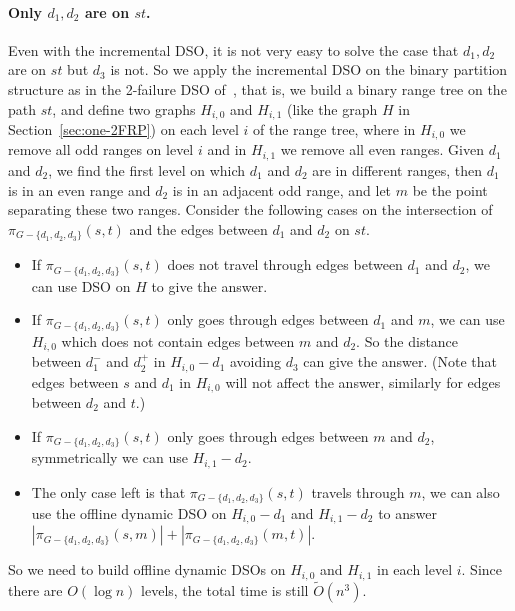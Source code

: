 \documentclass[11pt]{article}
\theoremstyle{plain}
\theoremstyle{definition}
\newcommand{\set}[1]{\{ #1 \}}
\newcommand{\og}[3]{\pi_{G-#3}\left(#1,#2\right)}
\begin{document}
\paragraph{Only $d_1,d_2$ are on $st$.} Even with the incremental DSO, it is not very easy to solve the case that $d_1,d_2$ are on $st$ but $d_3$ is not. So we apply the incremental DSO on the binary partition structure as in the 2-failure DSO of~\cite{duan2009dual}, that is, we build a binary range tree on the path $st$, and define two graphs $H_{i,0}$ and $H_{i,1}$ (like the graph $H$ in Section~\ref{sec:one-2FRP}) on each level $i$ of the range tree, where in $H_{i,0}$ we remove all odd ranges on level $i$ and in $H_{i,1}$ we remove all even ranges. Given $d_1$ and $d_2$, we find the first level on which $d_1$ and $d_2$ are in different ranges, then $d_1$ is in an even range and $d_2$ is in an adjacent odd range, and let $m$ be the point separating these two ranges. Consider the following cases on the intersection of $\og{s}{t}{\set{d_1, d_2,d_3}}$ and the edges between $d_1$ and $d_2$ on $st$.
\begin{itemize}
    \item If $\og{s}{t}{\set{d_1, d_2,d_3}}$ does not travel through edges between $d_1$ and $d_2$, we can use DSO on $H$ to give the answer.
    \item If $\og{s}{t}{\set{d_1, d_2,d_3}}$ only goes through edges between $d_1$ and $m$, we can use $H_{i,0}$ which does not contain edges between $m$ and $d_2$. So the distance between $d_1^-$ and $d_2^+$ in $H_{i,0}-d_1$ avoiding $d_3$ can give the answer. (Note that edges between $s$ and $d_1$ in $H_{i,0}$ will not affect the answer, similarly for edges between $d_2$ and $t$.)
    \item If $\og{s}{t}{\set{d_1, d_2,d_3}}$ only goes through edges between $m$ and $d_2$, symmetrically we can use $H_{i,1}-d_2$.
    \item The only case left is that $\og{s}{t}{\set{d_1, d_2,d_3}}$ travels through $m$, we can also use the offline dynamic DSO on $H_{i,0}-d_1$ and $H_{i,1}-d_2$ to answer $|\og{s}{m}{\set{d_1, d_2,d_3}}|+|\og{m}{t}{\set{d_1, d_2,d_3}}|$.
\end{itemize}

So we need to build offline dynamic DSOs on $H_{i,0}$ and $H_{i,1}$ in each level $i$. Since there are $O(\log n)$ levels, the total time is still $\tilde{O}(n^3)$.
\end{document}

